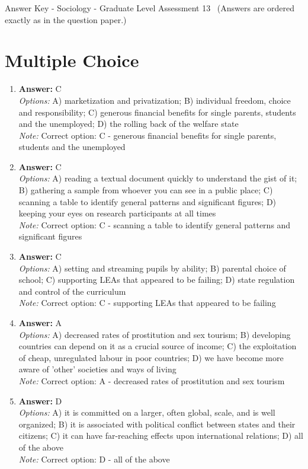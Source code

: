 \documentclass[12pt]{article}
\begin{document}
\begin{center}
Answer Key - Sociology - Graduate Level Assessment 13 \
\small (Answers are ordered exactly as in the question paper.)
\end{center}

\section*{Multiple Choice}
\begin{enumerate}[label=\arabic*.]
\item \textbf{Answer:} C
\\ \textit{Options:} A) marketization and privatization; B) individual freedom, choice and responsibility; C) generous financial benefits for single parents, students and the unemployed; D) the rolling back of the welfare state
\\ \textit{Note:} Correct option: C - generous financial benefits for single parents, students and the unemployed
\item \textbf{Answer:} C
\\ \textit{Options:} A) reading a textual document quickly to understand the gist of it; B) gathering a sample from whoever you can see in a public place; C) scanning a table to identify general patterns and significant figures; D) keeping your eyes on research participants at all times
\\ \textit{Note:} Correct option: C - scanning a table to identify general patterns and significant figures
\item \textbf{Answer:} C
\\ \textit{Options:} A) setting and streaming pupils by ability; B) parental choice of school; C) supporting LEAs that appeared to be failing; D) state regulation and control of the curriculum
\\ \textit{Note:} Correct option: C - supporting LEAs that appeared to be failing
\item \textbf{Answer:} A
\\ \textit{Options:} A) decreased rates of prostitution and sex tourism; B) developing countries can depend on it as a crucial source of income; C) the exploitation of cheap, unregulated labour in poor countries; D) we have become more aware of 'other' societies and ways of living
\\ \textit{Note:} Correct option: A - decreased rates of prostitution and sex tourism
\item \textbf{Answer:} D
\\ \textit{Options:} A) it is committed on a larger, often global, scale, and is well organized; B) it is associated with political conflict between states and their citizens; C) it can have far-reaching effects upon international relations; D) all of the above
\\ \textit{Note:} Correct option: D - all of the above
\end{enumerate}
\end{document}
